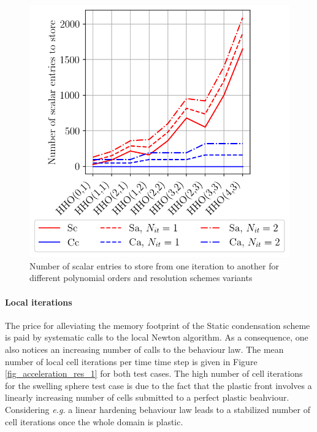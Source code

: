 \begin{figure}[H]
    \centering
    \includegraphics[width=8.cm]{../chapter_002_hho_mechanics/figures/plot_memory.png}
    \caption{Number of scalar entries to store from one iteration to another for different polynomial orders and resolution schemes variants}
    \label{fig_acceleration_res_memory}
\end{figure}

\paragraph{Local iterations}

The price for alleviating the memory footprint of the Static condensation scheme
is paid by systematic calls to the local Newton algorithm.
As a consequence, one also notices an increasing number of calls to the behaviour law.
The mean number of local cell iterations per time time step is given in Figure \ref{fig_acceleration_res_1} for both test cases. The high number of cell iterations for the swelling sphere test case is
due to the fact that the plastic front involves a linearly increasing number of cells submitted to a perfect plastic beahviour.
Considering \textit{e.g.} a linear hardening behaviour law leads to a stabilized number of cell iterations once the whole domain is plastic.

